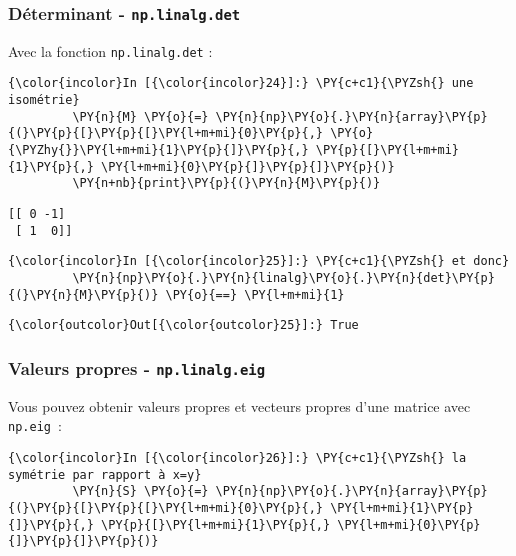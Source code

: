     \hypertarget{duxe9terminant---np.linalg.det}{%
\subsubsection{\texorpdfstring{Déterminant -
\texttt{np.linalg.det}}{Déterminant - np.linalg.det}}\label{duxe9terminant---np.linalg.det}}

    Avec la fonction \texttt{np.linalg.det} :

    \begin{Verbatim}[commandchars=\\\{\}]
{\color{incolor}In [{\color{incolor}24}]:} \PY{c+c1}{\PYZsh{} une isométrie}
         \PY{n}{M} \PY{o}{=} \PY{n}{np}\PY{o}{.}\PY{n}{array}\PY{p}{(}\PY{p}{[}\PY{p}{[}\PY{l+m+mi}{0}\PY{p}{,} \PY{o}{\PYZhy{}}\PY{l+m+mi}{1}\PY{p}{]}\PY{p}{,} \PY{p}{[}\PY{l+m+mi}{1}\PY{p}{,} \PY{l+m+mi}{0}\PY{p}{]}\PY{p}{]}\PY{p}{)}
         \PY{n+nb}{print}\PY{p}{(}\PY{n}{M}\PY{p}{)}
\end{Verbatim}


    \begin{Verbatim}[commandchars=\\\{\}]
[[ 0 -1]
 [ 1  0]]

    \end{Verbatim}

    \begin{Verbatim}[commandchars=\\\{\}]
{\color{incolor}In [{\color{incolor}25}]:} \PY{c+c1}{\PYZsh{} et donc}
         \PY{n}{np}\PY{o}{.}\PY{n}{linalg}\PY{o}{.}\PY{n}{det}\PY{p}{(}\PY{n}{M}\PY{p}{)} \PY{o}{==} \PY{l+m+mi}{1}
\end{Verbatim}


\begin{Verbatim}[commandchars=\\\{\}]
{\color{outcolor}Out[{\color{outcolor}25}]:} True
\end{Verbatim}
            
    \hypertarget{valeurs-propres---np.linalg.eig}{%
\subsubsection{\texorpdfstring{Valeurs propres -
\texttt{np.linalg.eig}}{Valeurs propres - np.linalg.eig}}\label{valeurs-propres---np.linalg.eig}}

    Vous pouvez obtenir valeurs propres et vecteurs propres d'une matrice
avec \texttt{np.eig}~:

    \begin{Verbatim}[commandchars=\\\{\}]
{\color{incolor}In [{\color{incolor}26}]:} \PY{c+c1}{\PYZsh{} la symétrie par rapport à x=y}
         \PY{n}{S} \PY{o}{=} \PY{n}{np}\PY{o}{.}\PY{n}{array}\PY{p}{(}\PY{p}{[}\PY{p}{[}\PY{l+m+mi}{0}\PY{p}{,} \PY{l+m+mi}{1}\PY{p}{]}\PY{p}{,} \PY{p}{[}\PY{l+m+mi}{1}\PY{p}{,} \PY{l+m+mi}{0}\PY{p}{]}\PY{p}{]}\PY{p}{)}
\end{Verbatim}


